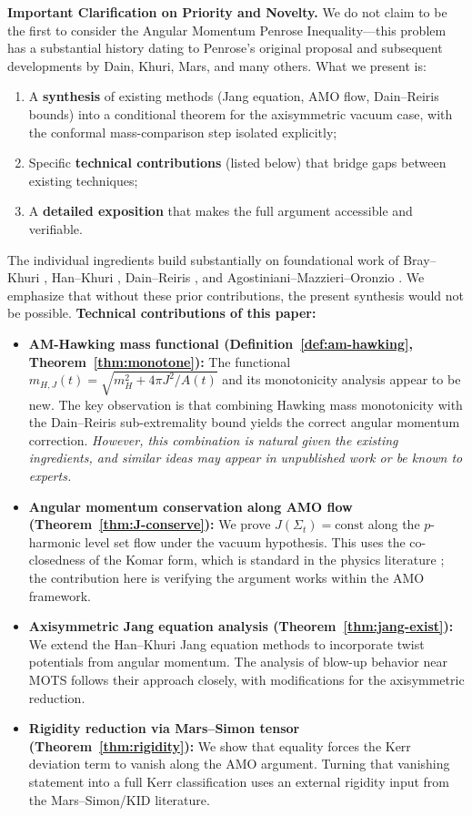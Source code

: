 \textbf{Important Clarification on Priority and Novelty.}
We do not claim to be the first to consider the Angular Momentum Penrose Inequality---this problem has a substantial history dating to Penrose's original proposal \cite{penrose1973} and subsequent developments by Dain, Khuri, Mars, and many others. What we present is:
\begin{enumerate}[label=(\roman*), leftmargin=2em]
    \item A \textbf{synthesis} of existing methods (Jang equation, AMO flow, Dain--Reiris bounds) into a conditional theorem for the axisymmetric vacuum case, with the conformal mass-comparison step isolated explicitly;
    \item Specific \textbf{technical contributions} (listed below) that bridge gaps between existing techniques;
    \item A \textbf{detailed exposition} that makes the full argument accessible and verifiable.
\end{enumerate}
The individual ingredients build substantially on foundational work of Bray--Khuri \cite{braykhuri2010}, Han--Khuri \cite{hankhuri2013}, Dain--Reiris \cite{dain2011}, and Agostiniani--Mazzieri--Oronzio \cite{amo2022}. We emphasize that without these prior contributions, the present synthesis would not be possible.
\textbf{Technical contributions of this paper:}
\begin{itemize}
    \item \textbf{AM-Hawking mass functional (Definition~\ref{def:am-hawking}, Theorem~\ref{thm:monotone}):} The functional $m_{H,J}(t) = \sqrt{m_H^2 + 4\pi J^2/A(t)}$ and its monotonicity analysis appear to be new. The key observation is that combining Hawking mass monotonicity with the Dain--Reiris sub-extremality bound yields the correct angular momentum correction. \textit{However, this combination is natural given the existing ingredients, and similar ideas may appear in unpublished work or be known to experts.}
    
    \item \textbf{Angular momentum conservation along AMO flow (Theorem~\ref{thm:J-conserve}):} We prove $J(\Sigma_t) = \mathrm{const}$ along the $p$-harmonic level set flow under the vacuum hypothesis. This uses the co-closedness of the Komar form, which is standard in the physics literature \cite{wald1984}; the contribution here is verifying the argument works within the AMO framework.
    
    \item \textbf{Axisymmetric Jang equation analysis (Theorem~\ref{thm:jang-exist}):} We extend the Han--Khuri Jang equation methods to incorporate twist potentials from angular momentum. The analysis of blow-up behavior near MOTS follows their approach closely, with modifications for the axisymmetric reduction.
    
    \item \textbf{Rigidity reduction via Mars--Simon tensor (Theorem~\ref{thm:rigidity}):} We show that equality forces the Kerr deviation term to vanish along the AMO argument. Turning that vanishing statement into a full Kerr classification uses an external rigidity input from the Mars--Simon/KID literature.
\end{itemize}

